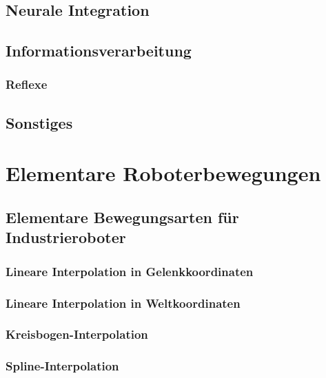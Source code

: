 \documentclass[a4paper, 11pt, accentcolor = tud3b]{tudreport}
\begin{document}
			\subsection{Neurale Integration} %

			\subsection{Informationsverarbeitung} %

				\subsubsection{Reflexe} %

			\subsection{Sonstiges} %

		\section{Elementare Roboterbewegungen} %

			\subsection{Elementare Bewegungsarten für Industrieroboter} %

				\subsubsection{Lineare Interpolation in Gelenkkoordinaten} %

				\subsubsection{Lineare Interpolation in Weltkoordinaten} %

				\subsubsection{Kreisbogen-Interpolation} %

				\subsubsection{Spline-Interpolation} %
\end{document}
